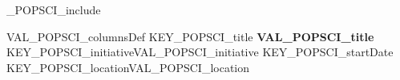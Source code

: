 %
\ifVAL_POPSCI_include %
\begin{myTableEnv}{VAL_POPSCI_columnsDef}
    \myRow
        {KEY_POPSCI_title}
        {\bfseries VAL_POPSCI_title}
        {KEY_POPSCI_initiative}{VAL_POPSCI_initiative}
    \myRow
        {KEY_POPSCI_startDate}{}
        {KEY_POPSCI_location}{VAL_POPSCI_location}
\end{myTableEnv}
%
\fi%
%